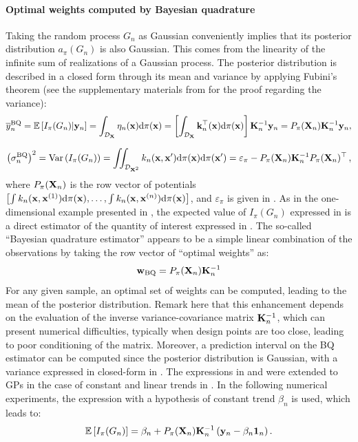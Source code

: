 \paragraph{Optimal weights computed by Bayesian quadrature}%
Taking the random process $G_n$ as Gaussian conveniently implies that its posterior distribution $a_\pi(G_n)$ is also Gaussian. 
This comes from the linearity of the infinite sum of realizations of a Gaussian process. 
The posterior distribution is described in a closed form through its mean and variance by applying Fubini's theorem (see the supplementary materials from \citealp{briol_oates_2019} for the proof regarding the variance): 
\begin{equation}
     \overline{y}_n^{\mathrm{BQ}} = \mathbb{E}\left[I_{\pi}(G_n) | {\bf y}_n \right] 
     = \int_{\mathcal{D}_{\bf X}} \eta_n({\bf x}) \mathrm{d} \pi({\bf x})
     = \left[\int_{\mathcal{D}_{\bf X}} {\bf k}_n^\top({\bf x}) \mathrm{d} \pi({\bf x}) \right] {\bf K}_n^{-1} {\bf y}_n
     = P_\pi({\bf X}_n) {\bf K}_n^{-1} {\bf y}_n,       
\label{eq:mean_post}
\end{equation}

\begin{equation}
    \left(\sigma_n^{\mathrm{BQ}}\right)^2 = \operatorname{Var}\left(I_{\pi}(G_n) \right) 
    = \iint_{\mathcal{D}_{{\bf X}^2}} k_n({\bf x}, {\bf x}') \mathrm{d} \pi({\bf x}) \mathrm{d} \pi({\bf x}') 
    = \varepsilon_\pi - P_\pi({\bf X}_n) {\bf K}_n^{-1} P_\pi({\bf X}_n)^\top \, ,
\label{eq:var_post}
\end{equation}
where $P_\pi({\bf X}_n)$ is the row vector of potentials $\left[\int k_n({\bf x}, {\bf x}^{(1)}) \mathrm{d} \pi({\bf x}), \dots, \int k_n({\bf x}, {\bf x}^{(n)}) \mathrm{d} \pi({\bf x})\right]$, and $\varepsilon_\pi$ is given in . 
As in the one-dimensional example presented in , the expected value of $I_{\pi}(G_n)$ expressed in  is a direct estimator of the quantity of interest expressed in . 
The so-called ``Bayesian quadrature estimator'' appears to be a simple linear combination of the observations by taking the row vector of ``optimal weights'' as: 
\begin{equation}
    \mathbf{w}_{\mathrm{BQ}} = P_\pi({\bf X}_n) {\bf K}_n^{-1}
    \label{eq:bq_weights}
\end{equation}
For any given sample, an optimal set of weights can be computed, leading to the mean of the posterior distribution. 
Remark here that this enhancement depends on the evaluation of the inverse variance-covariance matrix ${\bf K}_n^{-1}$, which can present numerical difficulties, typically when design points are too close, leading to poor conditioning of the matrix. 
Moreover, a prediction interval on the BQ estimator can be computed since the posterior distribution is Gaussian, with a variance expressed in closed-form in . 
The expressions in  and  were extended to GPs in the case of constant and linear trends in \cite{pronzato_zhigljavsky_2020}. 
In the following numerical experiments, the expression with a hypothesis of constant trend $\beta_n$ is used, which leads to:
\begin{equation}
     \mathbb{E}\left[I_{\pi}(G_n)\right] = \beta_n + P_\pi({\bf X}_n) {\bf K}_n^{-1} \left({\bf y}_n - \beta_n \mathbf{1}_n \right).
     \label{eq:mean_post_cst}
\end{equation}

